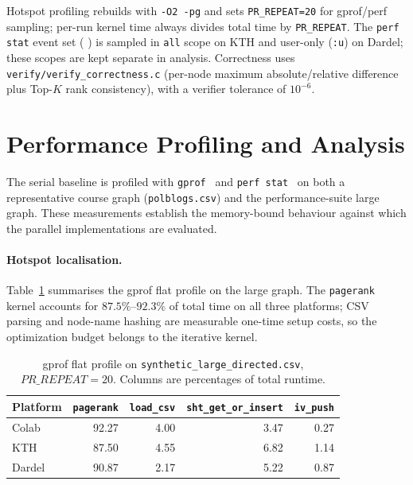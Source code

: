 \documentclass[11pt]{article}
\begin{document}
Hotspot profiling rebuilds with \texttt{-O2 -pg} and sets
\texttt{PR\_REPEAT=20} for gprof/perf sampling; per-run kernel time
always divides total time by \texttt{PR\_REPEAT}. The \texttt{perf stat}
event set (
) is sampled in
\texttt{all} scope on KTH and user-only
(\texttt{:u}) on Dardel; these scopes are kept separate in analysis.
Correctness uses \texttt{verify/verify\_correctness.c} (per-node maximum
absolute/relative difference plus Top-$K$ rank consistency), with a
verifier tolerance of $10^{-6}$.

\section{Performance Profiling and Analysis}
\label{sec:profiling}

The serial baseline is profiled with \texttt{gprof}~\cite{gprof} and
\texttt{perf stat}~\cite{perf} on both a representative course graph
(\texttt{polblogs.csv}) and the performance-suite large graph. These
measurements establish the memory-bound behaviour against which the
parallel implementations are evaluated.

\paragraph{Hotspot localisation.}
Table~\ref{tab:gprof-large} summarises the gprof flat profile on the
large graph. The \texttt{pagerank} kernel accounts for
$87.5\%$--$92.3\%$ of total time on all three platforms; CSV parsing
and node-name hashing are measurable one-time setup costs, so the
optimization budget belongs to the iterative kernel.

\begin{table}[H]
\centering
\caption{gprof flat profile on \texttt{synthetic\_large\_directed.csv},
$PR\_REPEAT=20$. Columns are percentages of total runtime.}
\label{tab:gprof-large}
\small
\begin{tabular}{lrrrr}
\toprule
Platform & \texttt{pagerank} & \texttt{load\_csv} & \texttt{sht\_get\_or\_insert} & \texttt{iv\_push} \\
\midrule
Colab  & 92.27 & 4.00 & 3.47 & 0.27 \\
KTH    & 87.50 & 4.55 & 6.82 & 1.14 \\
Dardel & 90.87 & 2.17 & 5.22 & 0.87 \\
\bottomrule
\end{tabular}
\end{table}
\end{document}
